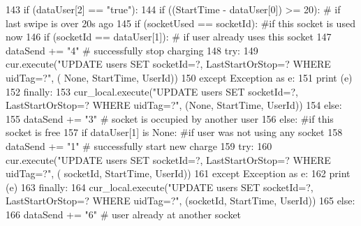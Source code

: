 \begin{DoxyCode}
143         \textcolor{keywordflow}{if} (dataUser[2] == \textcolor{stringliteral}{"true"}):
144             \textcolor{keywordflow}{if} ((StartTime - dataUser[0]) >= 20): \textcolor{comment}{# if last swipe is over 20s ago}
145                 \textcolor{keywordflow}{if} (socketUsed == socketId): \textcolor{comment}{#if this socket is used now}
146                     \textcolor{keywordflow}{if} (socketId == dataUser[1]): \textcolor{comment}{# if user already uses this socket}
147                         dataSend += \textcolor{stringliteral}{"4"} \textcolor{comment}{# successfully stop charging}
148                         \textcolor{keywordflow}{try}:
149                             cur.execute(\textcolor{stringliteral}{"UPDATE users SET socketId=?, LastStartOrStop=? WHERE uidTag=?"}, (\textcolor{keywordtype}{
      None}, StartTime, UserId))             
150                         \textcolor{keywordflow}{except} Exception \textcolor{keyword}{as} e:
151                             \textcolor{keywordflow}{print} (e)
152                         \textcolor{keywordflow}{finally}:
153                             cur\_local.execute(\textcolor{stringliteral}{"UPDATE users SET socketId=?, LastStartOrStop=? WHERE
       uidTag=?"}, (\textcolor{keywordtype}{None}, StartTime, UserId))
154                     \textcolor{keywordflow}{else}:
155                         dataSend += \textcolor{stringliteral}{"3"} \textcolor{comment}{# socket is occupied by another user }
156                 \textcolor{keywordflow}{else}: \textcolor{comment}{#if this socket is free}
157                     \textcolor{keywordflow}{if} dataUser[1] \textcolor{keywordflow}{is} \textcolor{keywordtype}{None}: \textcolor{comment}{#if user was not using any socket}
158                         dataSend += \textcolor{stringliteral}{"1"} \textcolor{comment}{# successfully start new charge}
159                         \textcolor{keywordflow}{try}:
160                             cur.execute(\textcolor{stringliteral}{"UPDATE users SET socketId=?, LastStartOrStop=? WHERE uidTag=?"}, (
      socketId, StartTime, UserId))
161                         \textcolor{keywordflow}{except} Exception \textcolor{keyword}{as} e:
162                             \textcolor{keywordflow}{print} (e)
163                         \textcolor{keywordflow}{finally}:
164                             cur\_local.execute(\textcolor{stringliteral}{"UPDATE users SET socketId=?, LastStartOrStop=? WHERE
       uidTag=?"}, (socketId, StartTime, UserId))
165                     \textcolor{keywordflow}{else}:
166                         dataSend += \textcolor{stringliteral}{"6"} \textcolor{comment}{# user already at another socket}

\end{DoxyCode}
